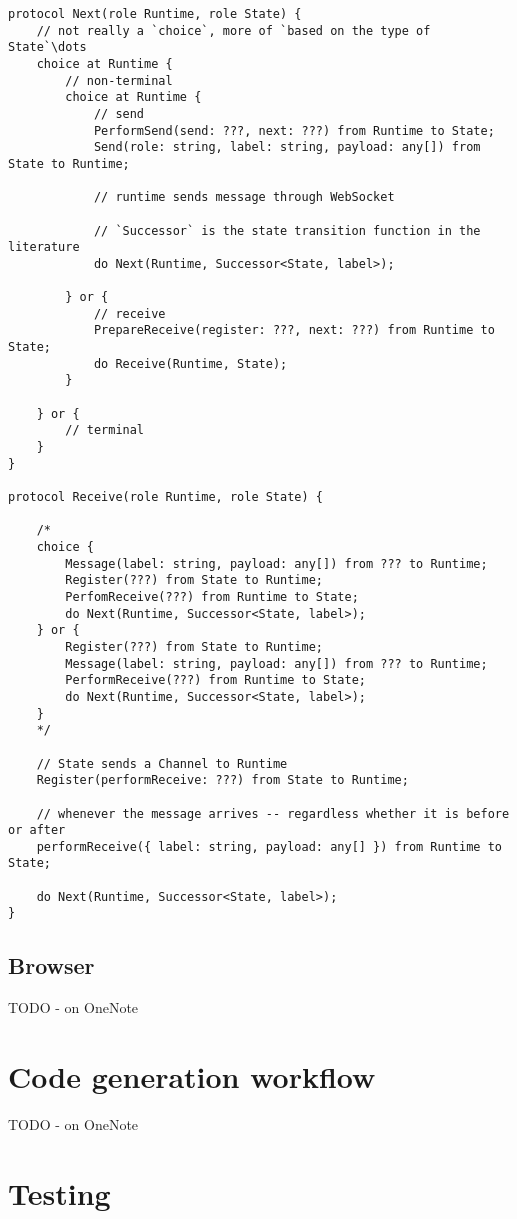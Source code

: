 \documentclass{article}
\begin{document}
\begin{lstlisting}[breaklines=true, tabsize=4, frame=single]
protocol Next(role Runtime, role State) {
	// not really a `choice`, more of `based on the type of State`\dots
	choice at Runtime {
		// non-terminal
		choice at Runtime {
			// send
			PerformSend(send: ???, next: ???) from Runtime to State;
			Send(role: string, label: string, payload: any[]) from State to Runtime;
			
			// runtime sends message through WebSocket
			
			// `Successor` is the state transition function in the literature
			do Next(Runtime, Successor<State, label>);
			
		} or {
			// receive
			PrepareReceive(register: ???, next: ???) from Runtime to State;
			do Receive(Runtime, State);
		}
		
	} or {
		// terminal
	}
}

protocol Receive(role Runtime, role State) {
	
	/*
	choice {
		Message(label: string, payload: any[]) from ??? to Runtime;
		Register(???) from State to Runtime;
		PerfomReceive(???) from Runtime to State;
		do Next(Runtime, Successor<State, label>);
	} or {
		Register(???) from State to Runtime;
		Message(label: string, payload: any[]) from ??? to Runtime;
		PerformReceive(???) from Runtime to State;
		do Next(Runtime, Successor<State, label>); 
	}
	*/
	
	// State sends a Channel to Runtime
	Register(performReceive: ???) from State to Runtime;
	
	// whenever the message arrives -- regardless whether it is before or after
	performReceive({ label: string, payload: any[] }) from Runtime to State;
	
	do Next(Runtime, Successor<State, label>);
}
\end{lstlisting}

\subsection{Browser}

TODO - on OneNote

\section{Code generation workflow}

TODO - on OneNote

\section{Testing}
\end{document}
